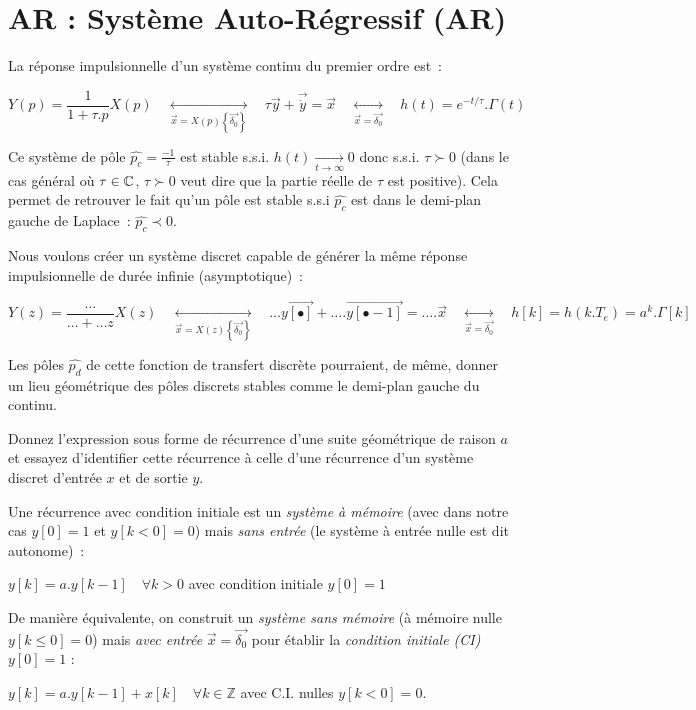 \section{AR : Système Auto-Régressif (AR)} 
\label{sec:AR}
La réponse impulsionnelle d'un système continu du premier ordre est~:

$$ Y(p) = \frac{1}{1+\tau. p} X(p) \quad \underset{\vec{x}=X(p)\left\{\vec{\delta_0}\right\}}{\longleftrightarrow} \quad \tau \vec{y} + \vec{\dot{y}} = \vec{x}\quad \underset{\vec{x}=\vec{\delta_0}}{\longleftrightarrow} \quad h(t) = e^{-t/\tau}.\Gamma(t)$$

Ce système de pôle $\widehat{p_c}=\frac{-1}{\tau}$ est stable s.s.i.
$h(t) \underset{t\to \infty}{\rightarrow} 0$ donc s.s.i. $\tau\succ 0$
(dans le cas général où $\tau \in \mathbb{C}$, $\tau\succ 0$ veut dire que la
partie réelle de $\tau$ est positive). Cela permet de retrouver le
fait qu'un pôle est stable s.s.i $\widehat{p_c}$ est dans le demi-plan gauche de
Laplace~: $\widehat{p_c}\prec 0$.


Nous voulons créer un système discret capable de
générer la même réponse impulsionnelle de durée infinie (asymptotique)~:

$$Y(z) = \frac{\dots}{\dots +\dots z} X(z) \quad \underset{\vec{x}=X(z)\left\{\vec{\delta_0}\right\}}{\longleftrightarrow} \quad  \dots \vec{y[\bullet]} + \dots. \vec{y[\bullet-1]} = \dots . \vec{x}\quad \underset{\vec{x}=\vec{\delta_0}}{\longleftrightarrow} \quad h[k] = h\left(k.T_e\right) = a^k.\Gamma[k]$$

Les pôles $\widehat{p_d}$ de cette fonction de transfert discrète pourraient, de même, donner un lieu géométrique des pôles discrets stables comme le demi-plan gauche du continu.





Donnez l'expression sous forme de récurrence d'une suite géométrique
de raison $a$ et essayez d'identifier cette récurrence à celle d'une
récurrence d'un système discret d'entrée $x$ et de sortie $y$.


\begin{remarque}
  Une récurrence avec condition initiale est un \emph{système à
    mémoire} (avec dans notre cas $y[0]=1$ et $y[k<0]=0$) mais
\emph{sans entrée} (le système à entrée nulle est dit autonome)~:
 
 $y[k]=a.y[k-1] \quad \forall k>0$ avec condition initiale $y[0]=1$

 De manière équivalente, on construit un \emph{système sans mémoire}
 (à mémoire nulle $y[k\leq 0]=0$) mais \emph{avec entrée}
 $\vec{x}=\vec{\delta_0}$ pour établir la \emph{condition initiale
   (CI)} $y[0]=1$ :
  
 $y[k]=a.y[k-1] + x[k] \quad \forall k\in\mathbb{Z}$ avec C.I. nulles
 $y[k<0]=0$.
 
 
\end{remarque}


